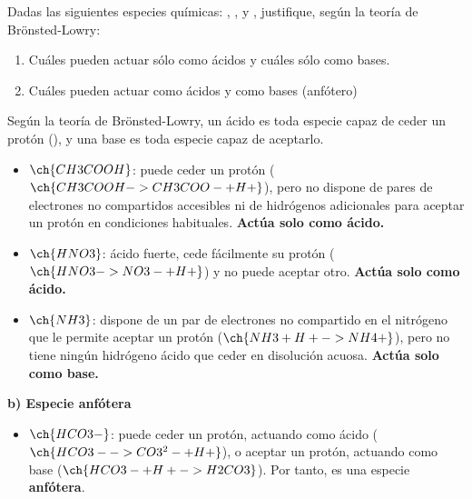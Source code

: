 \begin{exerciseEVAU}

    Dadas las siguientes especies químicas: , ,  y , justifique, según
    la teoría de Brönsted-Lowry:
    \begin{enumerate}[label=\letraminuscula]
        \item Cuáles pueden actuar sólo como ácidos y cuáles sólo como bases.
        \item Cuáles pueden actuar como ácidos y como bases (anfótero)
    \end{enumerate}
    \begin{solu}

        Según la teoría de Brönsted-Lowry, un ácido es toda especie capaz de ceder un protón (), y una base es toda especie capaz de aceptarlo.

        \begin{itemize}
            \item \(\ch{CH3COOH}\): puede ceder un protón (\(\ch{CH3COOH -> CH3COO- + H+}\)), pero no dispone de pares de electrones no compartidos accesibles ni de hidrógenos adicionales para aceptar un protón en condiciones habituales. \textbf{Actúa solo como ácido.}
            \item \(\ch{HNO3}\): ácido fuerte, cede fácilmente su protón (\(\ch{HNO3 -> NO3- + H+}\)) y no puede aceptar otro. \textbf{Actúa solo como ácido.}
            \item \(\ch{NH3}\): dispone de un par de electrones no compartido en el nitrógeno que le permite aceptar un protón (\(\ch{NH3 + H+ -> NH4+}\)), pero no tiene ningún hidrógeno ácido que ceder en disolución acuosa. \textbf{Actúa solo como base.}
        \end{itemize}

        \textbf{b) Especie anfótera}

        \begin{itemize}
            \item \(\ch{HCO3-}\): puede ceder un protón, actuando como ácido (\(\ch{HCO3- -> CO3^2- + H+}\)), o aceptar un protón, actuando como base (\(\ch{HCO3- + H+ -> H2CO3}\)). Por tanto, es una especie \textbf{anfótera}.
        \end{itemize}

    \end{solu}
\end{exerciseEVAU}

